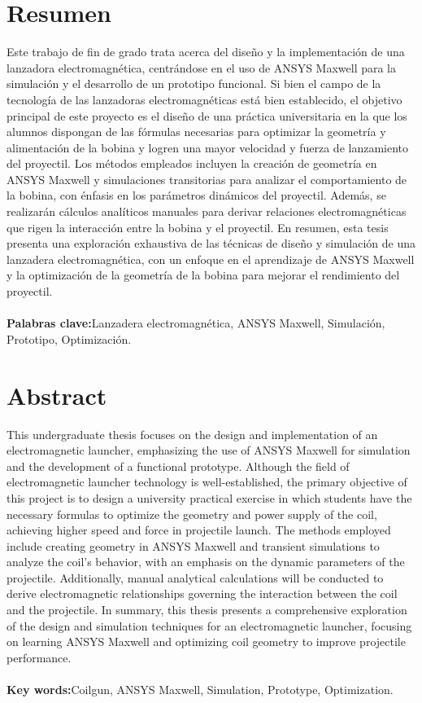 \section*{Resumen}

Este trabajo de fin de grado trata acerca del diseño y la implementación de una lanzadora electromagnética, centrándose en el uso de ANSYS Maxwell para la simulación y el desarrollo de un prototipo funcional. Si bien el campo de la tecnología de las lanzadoras electromagnéticas está bien establecido, el objetivo principal de este proyecto es el diseño de una práctica universitaria en la que los alumnos dispongan de las fórmulas necesarias para optimizar la geometría y alimentación de la bobina y logren una mayor velocidad y fuerza de lanzamiento del proyectil. Los métodos empleados incluyen la creación de geometría en ANSYS Maxwell y simulaciones transitorias para analizar el comportamiento de la bobina, con énfasis en los parámetros dinámicos del proyectil. Además, se realizarán cálculos analíticos manuales para derivar relaciones electromagnéticas que rigen la interacción entre la bobina y el proyectil. En resumen, esta tesis presenta una exploración exhaustiva de las técnicas de diseño y simulación de una lanzadera electromagnética, con un enfoque en el aprendizaje de ANSYS Maxwell y la optimización de la geometría de la bobina para mejorar el rendimiento del proyectil.
\\~\\
\textbf{Palabras clave:}Lanzadera electromagnética, ANSYS Maxwell, Simulación, Prototipo, Optimización.

\newpage
\thispagestyle{plain}
\section*{Abstract}
This undergraduate thesis focuses on the design and implementation of an electromagnetic launcher, emphasizing the use of ANSYS Maxwell for simulation and the development of a functional prototype. Although the field of electromagnetic launcher technology is well-established, the primary objective of this project is to design a university practical exercise in which students have the necessary formulas to optimize the geometry and power supply of the coil, achieving higher speed and force in projectile launch. The methods employed include creating geometry in ANSYS Maxwell and transient simulations to analyze the coil's behavior, with an emphasis on the dynamic parameters of the projectile. Additionally, manual analytical calculations will be conducted to derive electromagnetic relationships governing the interaction between the coil and the projectile. In summary, this thesis presents a comprehensive exploration of the design and simulation techniques for an electromagnetic launcher, focusing on learning ANSYS Maxwell and optimizing coil geometry to improve projectile performance.
\\~\\
\textbf{Key words:}Coilgun, ANSYS Maxwell, Simulation, Prototype, Optimization.